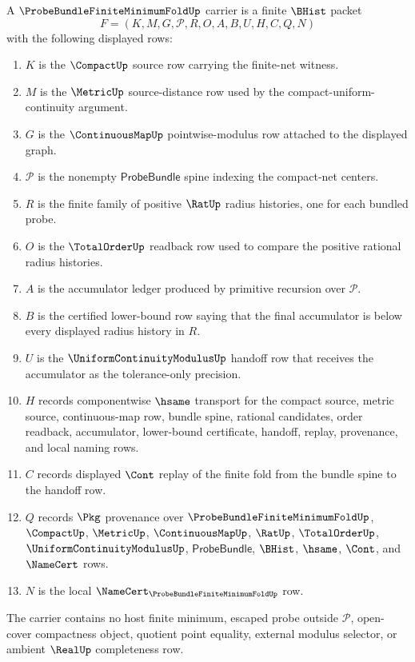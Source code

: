 \begin{definition}
\label{def:probe-bundle-finite-minimum-fold-carrier}
A $\ProbeBundleFiniteMinimumFoldUp$ carrier is a finite $\BHist$ packet
$$
F=(K,M,G,\mathcal{P},R,O,A,B,U,H,C,Q,N)
$$
with the following displayed rows:
\begin{enumerate}
\item $K$ is the $\CompactUp$ source row carrying the finite-net witness.
\item $M$ is the $\MetricUp$ source-distance row used by the compact-uniform-continuity argument.
\item $G$ is the $\ContinuousMapUp$ pointwise-modulus row attached to the displayed graph.
\item $\mathcal{P}$ is the nonempty $\mathsf{ProbeBundle}$ spine indexing the compact-net centers.
\item $R$ is the finite family of positive $\RatUp$ radius histories, one for each bundled probe.
\item $O$ is the $\TotalOrderUp$ readback row used to compare the positive rational radius histories.
\item $A$ is the accumulator ledger produced by primitive recursion over $\mathcal{P}$.
\item $B$ is the certified lower-bound row saying that the final accumulator is below every displayed radius history in $R$.
\item $U$ is the $\UniformContinuityModulusUp$ handoff row that receives the accumulator as the tolerance-only precision.
\item $H$ records componentwise $\hsame$ transport for the compact source, metric source, continuous-map row, bundle spine, rational candidates, order readback, accumulator, lower-bound certificate, handoff, replay, provenance, and local naming rows.
\item $C$ records displayed $\Cont$ replay of the finite fold from the bundle spine to the handoff row.
\item $Q$ records $\Pkg$ provenance over $\ProbeBundleFiniteMinimumFoldUp$, $\CompactUp$, $\MetricUp$, $\ContinuousMapUp$, $\RatUp$, $\TotalOrderUp$, $\UniformContinuityModulusUp$, $\mathsf{ProbeBundle}$, $\BHist$, $\hsame$, $\Cont$, and $\NameCert$ rows.
\item $N$ is the local $\NameCert_{\ProbeBundleFiniteMinimumFoldUp}$ row.
\end{enumerate}
The carrier contains no host finite minimum, escaped probe outside $\mathcal{P}$, open-cover compactness object, quotient point equality, external modulus selector, or ambient $\RealUp$ completeness row.
\end{definition}

